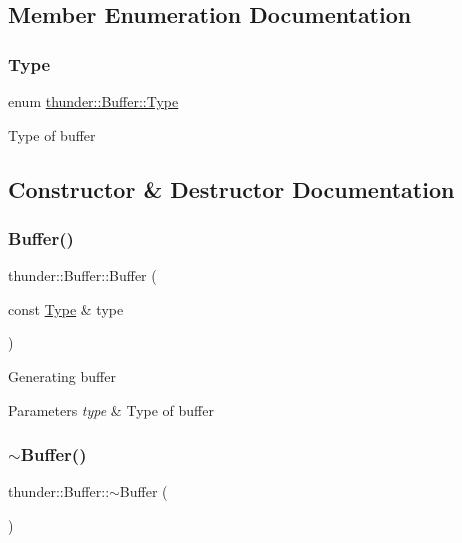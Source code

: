 \subsection{Member Enumeration Documentation}
\mbox{\label{classthunder_1_1_buffer_af4777908dbe80eb3fd327e1a489d43ad}} 
\subsubsection{\texorpdfstring{Type}{Type}}
{\footnotesize\ttfamily enum \mbox{\hyperlink{classthunder_1_1_buffer_af4777908dbe80eb3fd327e1a489d43ad}{thunder\+::\+Buffer\+::\+Type}}}

Type of buffer 

\subsection{Constructor \& Destructor Documentation}
\mbox{\label{classthunder_1_1_buffer_a583c81e036ea9533a97215b7a79d843c}} 
\subsubsection{\texorpdfstring{Buffer()}{Buffer()}}
{\footnotesize\ttfamily thunder\+::\+Buffer\+::\+Buffer (\begin{DoxyParamCaption}\item[{const \mbox{\hyperlink{classthunder_1_1_buffer_af4777908dbe80eb3fd327e1a489d43ad}{Type}} \&}]{type }\end{DoxyParamCaption})}

Generating buffer


\begin{DoxyParams}{Parameters}
{\em type} & Type of buffer \\
\hline
\end{DoxyParams}
\mbox{\label{classthunder_1_1_buffer_a2df5bdd1d256a1a162ea9f28a70669eb}} 
\subsubsection{\texorpdfstring{$\sim$\+Buffer()}{~Buffer()}}
{\footnotesize\ttfamily thunder\+::\+Buffer\+::$\sim$\+Buffer (\begin{DoxyParamCaption}{ }\end{DoxyParamCaption})}

